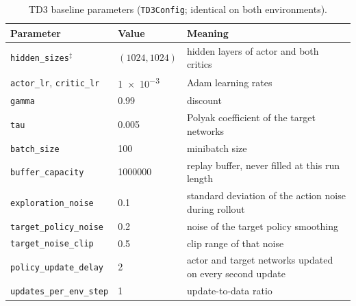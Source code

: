 \begin{table}[tbp]
  \centering
  \footnotesize
  \caption{TD3 baseline parameters (\texttt{TD3Config}; identical on both environments).}
  \label{tab:app-hp-td3}
  \begin{tabular}{@{}p{4.7cm}p{3.7cm}p{5.0cm}@{}}
    \toprule
    Parameter                                                   & Value                         & Meaning                                              \\
    \midrule
    \texttt{hidden\_\allowbreak sizes}$^{\ddagger}$                         & $(1024,1024)$                 & hidden layers of actor and both critics              \\
    \texttt{actor\_\allowbreak lr}, \texttt{critic\_\allowbreak lr}                     & \num{1e-3}                    & Adam learning rates                                  \\
    \texttt{gamma}                                              & \num{0.99}                    & discount                                             \\
    \texttt{tau}                                                & \num{0.005}                   & Polyak coefficient of the target networks            \\
    \texttt{batch\_\allowbreak size}                                        & \num{100}                     & minibatch size                                       \\
    \texttt{buffer\_\allowbreak capacity}                                   & \num{1000000}                 & replay buffer, never filled at this run length       \\
    \texttt{exploration\_\allowbreak noise}                                 & \num{0.1}                     & standard deviation of the action noise during rollout \\
    \texttt{target\_\allowbreak policy\_\allowbreak noise}                              & \num{0.2}                     & noise of the target policy smoothing                 \\
    \texttt{target\_\allowbreak noise\_\allowbreak clip}                                & \num{0.5}                     & clip range of that noise                             \\
    \texttt{policy\_\allowbreak update\_\allowbreak delay}                              & \num{2}                       & actor and target networks updated on every second update \\
    \texttt{updates\_\allowbreak per\_\allowbreak env\_\allowbreak step}                            & \num{1}                       & update-to-data ratio                                 \\
    \bottomrule
  \end{tabular}
\end{table}

